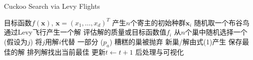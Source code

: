 \documentclass[lettersize,journal]{IEEEtran}
\begin{document}
\begin{algorithm}[H]
\caption{Cuckoo Search via Levy Flights}
\label{alg:cuckoo}
\begin{algorithmic}[1]
\STATE 目标函数$f(\bm{x})$, $\bm{x}=(x_1, \dots, x_d)^T$
\STATE 产生$n$个寄主的初始种群$\bm{x}_i$
\STATE 随机取一个布谷鸟
\STATE 通过Levy飞行产生一个解
\STATE 评估解的质量或目标函数值$f_i$
\STATE 从$n$个巢中随机选择一个 (假设为$j$)
\STATE 将$j$用解$i$代替
\ENDIF
\STATE 一部分 ($p_a$) 糟糕的巢被抛弃
\STATE 新巢/解由式(1)产生
\STATE 保存最佳的解
\STATE 排列解找出当前最佳
\STATE 更新$t \leftarrow t+1$
\ENDWHILE
\STATE 后处理与可视化
\end{algorithmic}
\end{algorithm}

\vfill
\end{document}
